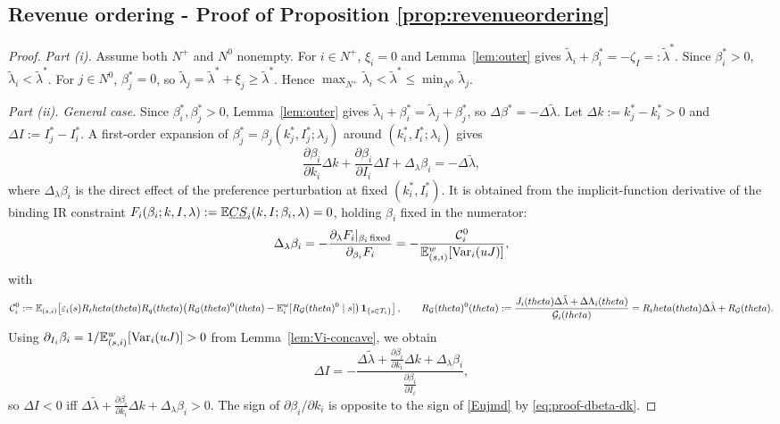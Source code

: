 \documentclass{class}
\begin{document}
\subsection{Revenue ordering - Proof of Proposition \ref{prop:revenueordering}}\label{proof:revenueordering}


\begin{proof}

\noindent\textit{Part (i).} Assume both $N^+$ and $N^0$ nonempty. For $i\in N^+$, $\xi_i=0$ and Lemma~\ref{lem:outer} gives $\tilde\lambda_i+\beta_i^\ast=-\zeta_I=:\tilde\lambda^\ast$. Since $\beta_i^\ast>0$, $\tilde\lambda_i<\tilde\lambda^\ast$. For $j\in N^0$, $\beta_j^\ast=0$, so $\tilde\lambda_j=\tilde\lambda^\ast+\xi_j\ge\tilde\lambda^\ast$. Hence $\max_{N^+}\tilde\lambda_i<\tilde\lambda^\ast\le\min_{N^0}\tilde\lambda_j$.

\noindent\textit{Part (ii). General case.} Since $\beta_i^\ast,\beta_j^\ast>0$, Lemma~\ref{lem:outer} gives $\tilde\lambda_i+\beta_i^\ast=\tilde\lambda_j+\beta_j^\ast$, so $\Delta\beta^\ast=-\Delta\tilde\lambda$. Let $\Delta k:=k_j^\ast-k_i^\ast>0$ and $\Delta I:=I_j^\ast-I_i^\ast$. A first-order expansion of $\beta_j^\ast=\beta_j(k_j^\ast,I_j^\ast;\lambda_j)$ around $(k_i^\ast,I_i^\ast;\lambda_i)$ gives \[ \frac{\partial \beta_i}{\partial k_i}\Delta k+\frac{\partial \beta_i}{\partial I_i}\Delta I+\Delta_\lambda\beta_i=-\Delta\tilde\lambda, \] where $\Delta_\lambda\beta_i$ is the direct effect of the preference perturbation at fixed $(k_i^\ast,I_i^\ast)$. It is obtained from the implicit-function derivative of the binding IR constraint $F_i(\beta_i;k,I,\lambda):=\mathbb{E}\underline{CS}_i(k,I;\beta_i,\lambda)=0$, holding $\beta_i$ fixed in the numerator: \[ \Delta_\lambda\beta_i=-\frac{\partial_\lambda F_i|_{\beta_i\,\text{fixed}}}{\partial_{\beta_i}F_i}=-\frac{\mathcal C_i^0}{\mathbb{E}_{(s,i)}^w[\mathrm{Var}_i(uJ)]}, \] with \[ \mathcal C_i^0:=\mathbb{E}_{(s,i)}\!\left[\varepsilon_i(s)R_theta(theta)R_q(theta)\!\left(R_{\mathcal{G}}(theta)^{0}(theta)-\mathbb{E}_i^w[R_{\mathcal{G}}(theta)^{0}\mid s]\right)\mathbf 1_{\{s\in T_i\}}\right], \qquad R_{\mathcal{G}}(theta)^{0}(theta):=\frac{J_i(theta)\Delta\tilde\lambda+\Delta\Lambda_i(theta)}{\mathcal{G}_i(theta)}=R_theta(theta)\Delta\tilde\lambda+R_{\mathcal{G}}(theta). \] Using $\partial_{I_i}\beta_i=1/\mathbb{E}_{(s,i)}^w[\mathrm{Var}_i(uJ)]>0$ from Lemma~\ref{lem:Vi-concave}, we obtain \[ \Delta I=-\frac{\Delta\tilde\lambda+\frac{\partial\beta_i}{\partial k_i}\Delta k+\Delta_\lambda\beta_i}{\frac{\partial\beta_i}{\partial I_i}}, \] so $\Delta I<0$ iff $\Delta\tilde\lambda+\frac{\partial\beta_i}{\partial k_i}\Delta k+\Delta_\lambda\beta_i>0$. The sign of $\partial\beta_i/\partial k_i$ is opposite to the sign of \ref{Eujmd} by \ref{eq:proof-dbeta-dk}.


\end{proof}
\end{document}
